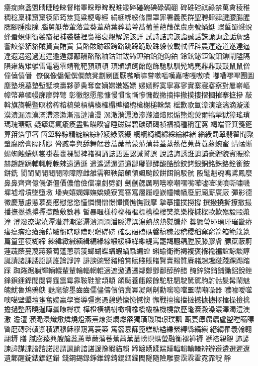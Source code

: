 痿痴痳盞盟睛睫睦睞督睹睪睬睜睥睨睢矮碎碰碗碘碌碉硼
碑碓硿祺祿禁萬禽稜稚稠稔稟稞窟窠筷節筠筮筧粱粳粵經
絹綑綁綏絛置罩罪署義羨群聖聘肆肄腱腰腸腥腮腳腫腹腺
腦舅艇蒂葷落萱葵葦葫葉葬葛萼萵葡董葩葭葆虞虜號蛹蜓
蜈蜇蜀蛾蛻蜂蜃蜆蜊衙裟裔裙補裘裝裡裊裕裒覜解詫該詳
試詩詰誇詼詣誠話誅詭詢詮詬詹詻訾詨豢貊貉賊資賈賄貲
賃賂賅跡跟跨路跳跺跪跤跦躲較載軾輊辟農運遊道遂達逼
違遐遇遏過遍遑逾遁鄒鄗酬酪酩釉鈷鉗鈸鈽鉀鈾鉛鉋鉤鉑
鈴鉉鉍鉅鈹鈿鉚閘隘隔隕雍雋雉雊雷電雹零靖靴靶預頑頓
頊頒頌飼飴飽飾馳馱馴髡鳩麂鼎⿍鼓⿎鼠⿏僧僮僥僖僭
僚僕像僑僱僎僩兢凳劃劂匱厭嗾嘀嘛嘗嗽嘔嘆嘉嘍嘎嗷嘖
嘟嘈嘐嗶團圖塵塾境墓墊塹墅塽壽夥夢夤奪奩嫡嫦嫩嫗嫖
嫘嫣孵寞寧寡寥實寨寢寤察對屢嶄嶇幛幣幕幗幔廓廖弊彆
彰徹慇愿態慷慢慣慟慚慘慵截撇摘摔撤摸摟摺摑摧搴摭摻
敲斡旗旖暢暨暝榜榨榕槁榮槓構榛榷榻榫榴槐槍榭槌榦槃
榣歉歌氳漳演滾漓滴漩漾漠漬漏漂漢滿滯漆漱漸漲漣漕漫
漯澈漪滬漁滲滌滷熔熙煽熊熄熒爾犒犖獄獐瑤瑣瑪瑰瑭甄
疑瘧瘍瘋瘉瘓盡監瞄睽睿睡磁碟碧碳碩碣禎福禍種稱窪窩
竭端管箕箋筵算箝箔箏箸箇箄粹粽精綻綰綜綽綾綠緊綴
網綱綺綢綿綵綸維緒緇綬罰翠翡翟聞聚肇腐膀膏膈膊腿
膂臧臺與舔舞艋蓉蒿蓆蓄蒙蒞蒲蒜蓋蒸蓀蓓蒐蒼蓑蓊蜿蜜
蜻蜢蜥蜴蜘蝕蜷蜩裳褂裴裹裸製裨褚裯誦誌語誣認誡誓誤
說誥誨誘誑誚誧豪貍貌賓賑賒赫趙趕跼輔輒輕輓辣遠遘遜
遣遙遞遢遝遛鄙鄘鄞酵酸酷酴鉸銬銀銅銘銖鉻銓銜銨鉼銑
閡閨閩閣閥閤隙障際雌雒需靼鞅韶頗領颯颱餃餅餌餉駁骯
骰髦魁魂鳴鳶鳳麼鼻⿐齊⿑億儀僻僵價儂儈儉儅凜劇劈劉
劍劊勰厲嘮嘻嘹嘲嘿嘴嘩噓噎噗噴嘶嘯嘰墀墟增墳墜墮墩
墦奭嬉嫻嬋嫵嬌嬈寮寬審寫層履嶝嶔幢幟幡廢廚廟廝廣廠
彈影德徵慶慧慮慝慕憂慼慰慫慾憧憐憫憎憬憚憤憔憮戮摩
摯摹撞撲撈撐撰撥撓撕撩撒撮播撫撚撬撙撢撳敵敷數暮
暫暴暱樣樟槨樁樞標槽模樓樊槳樂樅槭樑歐歎殤毅毆漿潼
澄潑潦潔澆潭潛潸潮澎潺潰潤澗潘滕潯潠潟熟熬熱熨牖犛
獎獗瑩璋璃瑾璀畿瘠瘩瘟瘤瘦瘡瘢皚皺盤瞎瞇瞌瞑瞋磋磅
確磊碾磕碼磐稿稼穀稽稷稻窯窮箭箱範箴篆篇篁箠篌糊締
練緯緻緘緬緝編緣線緞緩綞緙緲緹罵罷羯翩耦膛膜膝膠膚
膘蔗蔽蔚蓮蔬蔭蔓蔑蔣蔡蔔蓬蔥蓿蔆螂蝴蝶蝠蝦蝸蝨蝙蝗
蝌蝓衛衝褐複褒褓褕褊誼諒談諄誕請諸課諉諂調誰論諍誶
誹諛豌豎豬賠賞賦賤賬賭賢賣賜質賡赭趟趣踫踐踝踢踏踩
踟踡踞躺輝輛輟輩輦輪輜輞輥適遮遨遭遷鄰鄭鄧鄱醇醉醋
醃鋅銻銷鋪鋤鋁銳銼鋒鋇鋰銲閭閱霄霆震霉靠鞍鞋鞏頡頫
頜颳養餓餒餘駝駐駟駛駑駕駒駙骷髮髯鬧魅魄魷魯鴆鴉鴃
麩麾黎墨⿒齒儒儘儔儐儕冀冪凝劑劓勳噙噫噹噩噤噸噪器
噥噱噯噬噢噶壁墾壇壅奮嬝嬴學寰導彊憲憑憩憊懍憶憾懊
懈戰擅擁擋撻撼據擄擇擂操撿擒擔撾整曆曉暹曄曇暸樽樸
樺橙橫橘樹橄橢橡橋橇樵機橈歙歷氅濂澱澡濃澤濁澧澳激
澹澶澦澠澴熾燉燐燒燈燕熹燎燙燜燃燄獨璜璣璘璟璞瓢
甌甍瘴瘸瘺盧盥瞠瞞瞟瞥磨磚磬磧禦積穎穆穌穋窺篙簑築
篤篛篡篩篦糕糖縊縑縈縛縣縞縝縉縐罹羲翰翱翮耨膳
膩膨臻興艘艙蕊蕙蕈蕨蕩蕃蕉蕭蕪蕞螃螟螞螢融衡褪褲褥
褫褡親覦諦諺諫諱謀諜諧諮諾謁謂諷諭諳諶諼豫豭貓賴
蹄踱踴蹂踹踵輻輯輸輳辨辦遵遴選遲遼遺鄴醒錠錶鋸錳錯
錢鋼錫錄錚錐錦錡錕錮錙閻隧隨險雕霎霑霖霍霓霏靛靜
